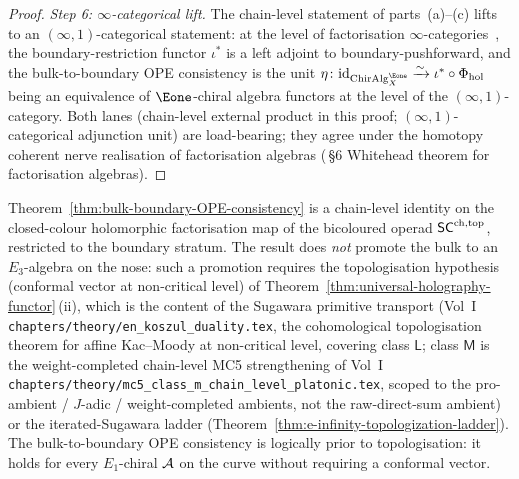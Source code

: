 \begin{proof}
\emph{Step 6: $\infty$-categorical lift.}
The chain-level statement of parts~(a)--(c) lifts to an
$(\infty,1)$-categorical statement: at the level of factorisation
$\infty$-categories~\cite{AF15,FG12}, the
boundary-restriction functor $\iota^*$ is a left
adjoint to boundary-pushforward, and the bulk-to-boundary OPE
consistency is the unit $\eta\colon \id_{\mathrm{ChirAlg}_X^{\Eone}}
\xrightarrow{\sim} \iota^* \circ \Phi_{\mathrm{hol}}$ being an
equivalence of $\Eone$-chiral algebra functors at the level of
the $(\infty,1)$-category. Both lanes (chain-level external product
in this proof; $(\infty,1)$-categorical adjunction unit) are
load-bearing; they agree under
the homotopy coherent nerve realisation of factorisation algebras
(\cite{CG21}\,\S6 Whitehead theorem for factorisation algebras).
\end{proof}

\begin{remark}\label{rem:bulk-bdry-pattern-277-scope}%

Theorem~\ref{thm:bulk-boundary-OPE-consistency} is a chain-level
identity on the closed-colour holomorphic factorisation map of the
bicoloured operad $\mathsf{SC}^{\mathrm{ch},\mathrm{top}}$, restricted to the boundary stratum.
The result does \emph{not} promote the bulk to an $E_3$-algebra on
the nose: such a promotion requires the topologisation hypothesis
(conformal vector at non-critical level) of
Theorem~\ref{thm:universal-holography-functor}\,(ii), which is the
content of the Sugawara primitive transport
(Vol~I \texttt{chapters/theory/en\_koszul\_duality.tex}, the
cohomological topologisation theorem for affine Kac--Moody at
non-critical level, covering class $\mathsf L$; class $\mathsf M$
is the weight-completed chain-level MC5 strengthening of Vol~I
\texttt{chapters/theory/mc5\_class\_m\_chain\_level\_platonic.tex},
scoped to the pro-ambient / $J$-adic / weight-completed ambients,
not the raw-direct-sum ambient) or the iterated-Sugawara
ladder (Theorem~\ref{thm:e-infinity-topologization-ladder}). The
bulk-to-boundary OPE consistency is logically prior to
topologisation: it holds for every $E_1$-chiral $\mathcal{A}$ on the curve
without requiring a conformal vector.
\end{remark}

